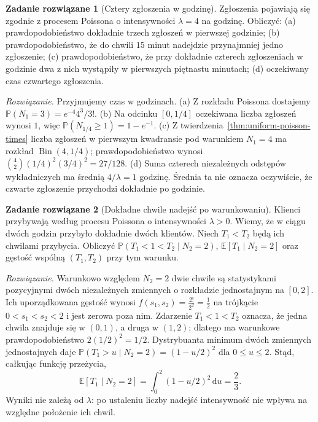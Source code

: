 \documentclass[11pt,a4paper,oneside]{report}
\numberwithin{equation}{chapter}
\theoremstyle{plain}
\theoremstyle{definition}
\newtheorem{zadanie}{Zadanie rozwiązane}[chapter]
\theoremstyle{remark}
\newcommand{\Prob}{\mathbb{P}}
\newcommand{\E}{\mathbb{E}}
\newcommand{\dd}{\mathrm{d}}
\begin{document}
\begin{zadanie}[Cztery zgłoszenia w godzinę]
Zgłoszenia pojawiają się zgodnie z procesem Poissona o
intensywności $\lambda=4$ na godzinę. Obliczyć: (a)
prawdopodobieństwo dokładnie trzech zgłoszeń w pierwszej godzinie;
(b) prawdopodobieństwo, że do chwili $15$ minut nadejdzie
przynajmniej jedno zgłoszenie; (c) prawdopodobieństwo,
że przy dokładnie czterech zgłoszeniach w godzinie dwa z nich
wystąpiły w pierwszych piętnastu minutach;
(d) oczekiwany czas czwartego zgłoszenia.

\emph{Rozwiązanie.} Przyjmujemy czas w godzinach.
(a) Z rozkładu Poissona dostajemy
$\Prob(N_1=3)=e^{-4}4^3/3!$.
(b) Na odcinku $[0,1/4]$ oczekiwana liczba zgłoszeń wynosi
$1$, więc $\Prob(N_{1/4}\ge1)=1-e^{-1}$.
(c) Z twierdzenia~\ref{thm:uniform-poisson-times} liczba
zgłoszeń w pierwszym kwadransie pod warunkiem $N_1=4$
ma rozkład $\operatorname{Bin}(4,1/4)$; prawdopodobieństwo
wynosi $\binom42(1/4)^2(3/4)^2=27/128$.
(d) Suma czterech niezależnych odstępów wykładniczych ma średnią
$4/\lambda=1$ godzinę. Średnia ta nie oznacza oczywiście, że
czwarte zgłoszenie przychodzi dokładnie po godzinie.
\end{zadanie}


\begin{zadanie}[Dokładne chwile nadejść po warunkowaniu]
Klienci przybywają według procesu Poissona o intensywności
$\lambda>0$. Wiemy, że w ciągu dwóch godzin przybyło dokładnie
dwóch klientów. Niech $T_1<T_2$ będą ich chwilami przybycia.
Obliczyć $\Prob(T_1<1<T_2\mid N_2=2)$,
$\E[T_1\mid N_2=2]$ oraz gęstość wspólną $(T_1,T_2)$
przy tym warunku.

\emph{Rozwiązanie.} Warunkowo względem $N_2=2$
dwie chwile są statystykami pozycyjnymi dwóch niezależnych
zmiennych o rozkładzie jednostajnym na $[0,2]$.
Ich uporządkowana gęstość wynosi
$f(s_1,s_2)=\frac{2!}{2^2}=\frac12$ na trójkącie
$0<s_1<s_2<2$ i jest zerowa poza nim. Zdarzenie
$T_1<1<T_2$ oznacza, że jedna chwila znajduje się
w $(0,1)$, a druga w $(1,2)$; dlatego ma warunkowe
prawdopodobieństwo $2(1/2)^2=1/2$.
Dystrybuanta minimum dwóch zmiennych jednostajnych daje
$\Prob(T_1>u\mid N_2=2)=(1-u/2)^2$ dla $0\le u\le2$.
Stąd, całkując funkcję przeżycia,
\[
\E[T_1\mid N_2=2]
=\int_0^2(1-u/2)^2\,\dd u=\frac23.
\]
Wyniki nie zależą od $\lambda$: po ustaleniu liczby nadejść
intensywność nie wpływa na względne położenie ich chwil.
\end{zadanie}
\end{document}
